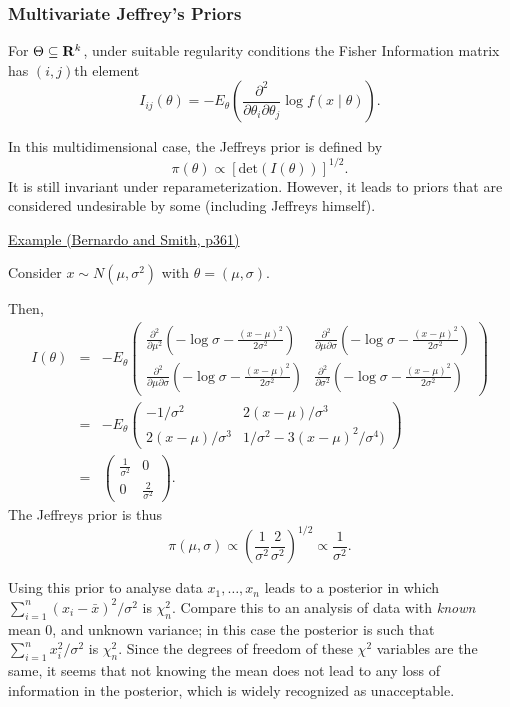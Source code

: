 \documentclass[12pt]{article}
\def\ni{\noindent}
\begin{document}
\subsubsection{Multivariate Jeffrey's Priors}

For $\Theta \subseteq {\bf R}^k$, under suitable regularity conditions
the Fisher Information matrix has
$(i,j)$th element
$$I_{ij}(\theta)=-E_{\theta}\left( \frac{\partial^2}{\partial\theta_i \partial\theta_j}
  \log f(x\mid \theta) \right).$$

In this
multidimensional case, the Jeffreys prior is defined by
$$\pi(\theta)\propto [\mbox{det}(I(\theta))]^{1/2}.$$
It is still invariant under reparameterization.  
However, it leads to priors that are considered undesirable by some
(including Jeffreys himself).

\ni\underline{Example (Bernardo and Smith, p361)}

Consider $x\sim N(\mu, \sigma^2)$ with $\theta=(\mu, \sigma)$.

Then,
\begin{eqnarray*}
I(\theta)&=&-E_\theta \left(\begin{array}{ll}
 \frac{\partial^2}{\partial\mu^2}(-\log\sigma -\frac{(x-\mu)^2}{2\sigma^2})
 &\frac{\partial^2}{\partial\mu\partial\sigma}(-\log\sigma -\frac{(x-\mu)^2}{2\sigma^2})\\
\frac{\partial^2}{\partial\mu\partial\sigma}(-\log\sigma -\frac{(x-\mu)^2}{2\sigma^2})
&\frac{\partial^2}{\partial\sigma^2}(-\log\sigma -\frac{(x-\mu)^2}{2\sigma^2})
\end{array}\right)\\
&=& -E_\theta \left(\begin{array}{cl}
-1/\sigma^2 & 2(x-\mu)/\sigma^3\\
2(x-\mu)/\sigma^3 & 1/\sigma^2 - 3(x-\mu)^2/\sigma^4)
\end{array}\right)\\
&=&\left(\begin{array}{cc}
\frac{1}{\sigma^2}&0\\
0&\frac{2}{\sigma^2}
\end{array}\right).
\end{eqnarray*}
The Jeffreys prior is thus
$$
\pi(\mu,\sigma)\propto
\left(\frac{1}{\sigma^2}\frac{2}{\sigma^2}\right)^{1/2} \propto
\frac{1}{\sigma^2}.
$$

Using this prior to analyse data $x_1,\dots,x_n$ leads to a posterior in which $\sum_{i=1}^n (x_i - \bar{x})^2 / \sigma^2$ is $\chi_n^2$. Compare this to an analysis of data with {\it known} mean $0$,
and unknown variance; in this case the posterior is such that $\sum_{i=1}^n x_i^2/\sigma^2$ is 
$\chi_n^2$. Since the degrees of freedom of these $\chi^2$ variables are the same, it seems that not knowing the mean does not lead to any loss of information
in the posterior, which is widely recognized as unacceptable. 
\end{document}
